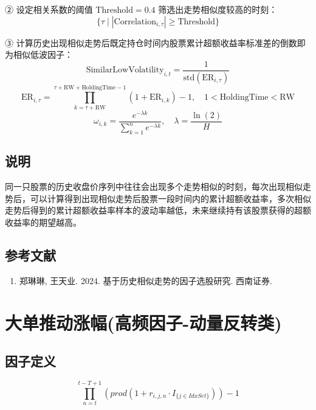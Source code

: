 \documentclass{article}
\begin{document}
② 设定相关系数的阈值 \( \mathrm{Threshold}=0.4 \) 筛选出走势相似度较高的时刻：
\begin{equation}
    \{ \tau \mid |\mathrm{Correlation}_{i,\tau}| \geq \mathrm{Threshold} \}
\end{equation}

③ 计算历史出现相似走势后既定持仓时间内股票累计超额收益率标准差的倒数即为相似低波因子：
\begin{equation}
    \mathrm{SimilarLowVolatility}_{i,t} = \frac{1}{\mathrm{std}(\mathrm{ER}_{i,\tau})}
\end{equation}
\begin{equation}
    \mathrm{ER}_{i,\tau} = \prod_{k=\tau+\mathrm{RW}}^{\tau+\mathrm{RW}+\mathrm{HoldingTime}-1} (1 + \mathrm{ER}_{i,k}) - 1, \quad 1 < \mathrm{HoldingTime} < \mathrm{RW}
\end{equation}
\begin{equation}
    \omega_{i,k} = \frac{e^{-\lambda k}}{\sum_{k=1}^{n} e^{-\lambda k}}, \quad \lambda = \frac{\ln(2)}{H}
\end{equation}

\subsection{说明}
同一只股票的历史收盘价序列中往往会出现多个走势相似的时刻，每次出现相似走势后，可以计算得到出现相似走势后股票一段时间内的累计超额收益率，多次相似走势后得到的累计超额收益率样本的波动率越低，未来继续持有该股票获得的超额收益率的期望越高。

\subsection{参考文献}
\begin{enumerate}
    \item 郑琳琳, 王天业. 2024. 基于历史相似走势的因子选股研究. 西南证券.
\end{enumerate}

\section{大单推动涨幅(高频因子-动量反转类)}

\subsection{因子定义}


\begin{equation}
    \prod_{n=t}^{t-T+1} \left( prod\left( 1 + r_{i,j,n} \cdot I_{\{j\in IdxSet\}}\right) \right) - 1
\end{equation}
\end{document}
